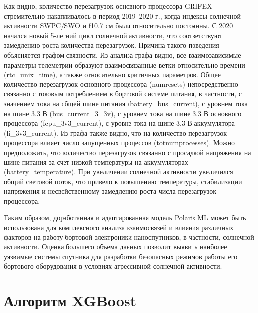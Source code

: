 \documentclass[12pt, a4paper]{extreport}
\begin{document}
Как видно, количество перезагрузок основного процессора GRIFEX стремительно накапливалось в период 2019–2020 г., когда индексы солнечной активности SWPC/SWO и f10.7 см были относительно постоянны. С 2020 начался новый 5-летний цикл солнечной активности, что соответствуют замедлению роста количества перезагрузок. Причина такого поведения объясняется графом связности. Из анализа графа видно, все взаимозависимые параметры телеметрии образуют
взаимосвязанные ветки относительно времени (rtc\_unix\_time), а также относительно критичных параметров. Общее количество перезагрузок основного процессора (numresets) непосредственно связанно с токовым потреблением в бортовой системе питания, в частности, с значением тока на общей шине питания (battery\_bus\_current), с уровнем тока на шине 3.3 В (bus\_current\_3\_3v), с уровнем тока на шине 3.3 В основного процессора (fcpu\_3v3\_current), с уровне тока на шине 3.3 В аккумулятора (li\_3v3\_current).
Из графа также видно, что на количество перезагрузок процессора влияет число запущенных процессов (totnumprocesses). Можно предположить, что количество перезагрузок связанно с просадкой напряжения на шине питания за счет низкой температуры на аккумуляторах (battery\_temperature). При увеличении солнечной активности увеличился общий световой поток, что привело к повышению температуры, стабилизации напряжения и несвойственному замедлению роста числа перезагрузок процессора.

Таким образом, доработанная и адаптированная модель Polaris ML может быть использована для комплексного анализа взаимосвязей и влияния различных факторов на работу бортовой электроники наноспутников, в частности, солнечной активности. Оценка большего объема данных позволит выявить наиболее уязвимые системы спутника для разработки безопасных режимов работы его бортового оборудования в условиях агрессивной солнечной активности.

\section{Алгоритм XGBoost}
\end{document}
